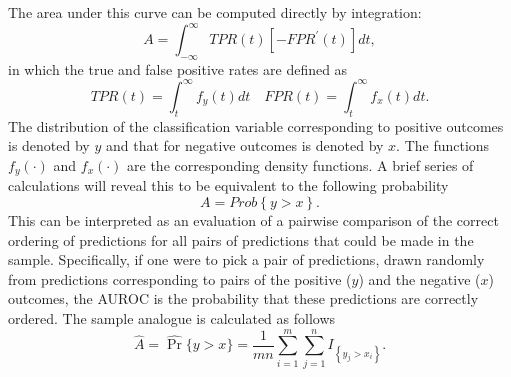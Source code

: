 The area under this curve can be computed directly by integration: 
% 
\begin{equation}
    A = \int_{-\infty}^{\infty} TPR(t) [-FPR^{\prime}(t)] dt, 
\end{equation}
% 
\noindent in which the true and false positive rates are defined as 
% 
\begin{equation}
    TPR(t) = \int_{t}^{\infty} f_y(t) dt \quad FPR(t) = \int_{t}^{\infty} f_x(t) dt. 
\end{equation}
% 
The distribution of the classification variable corresponding to positive outcomes is denoted by $y$ and that for negative outcomes is denoted by $x$. The functions $f_y(\cdot)$ and $f_x(\cdot)$ are the corresponding density functions. 
% 
A brief series of calculations will reveal this to be equivalent to the following probability
% 
\begin{equation}
    A = Prob{\left\{ y > x \right\}}.
\end{equation}
% 
This can be interpreted as an evaluation of a pairwise comparison of the correct ordering of predictions for all pairs of predictions that could be made in the sample. 
% 
Specifically, if one were to pick a pair of predictions, drawn randomly from predictions corresponding to pairs of the positive ($y$) and the negative ($x$) outcomes, the AUROC is the probability that these predictions are correctly ordered.
% 
The sample analogue is calculated as follows
%
\begin{equation} \label{eqn:auroc}
    \hat{A} = \hat{\Pr} \{ y > x \} = \frac{1}{m n} \sum_{i = 1}^{m} \sum_{j = 1}^{n} I_{\left\{ y_j > x_i \right\}}.
\end{equation}
% 



